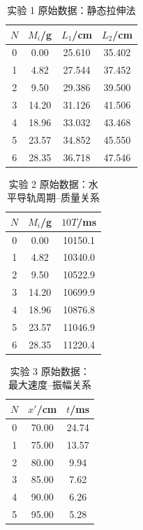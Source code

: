 \documentclass[UTF8,zihao=-4]{ctexart}
\begin{document}
\begin{table}[H]
\centering
\small
\caption{实验 1 原始数据：静态拉伸法}
\label{tab:raw1}
\begin{tabular}{cccc}
\toprule
$N$ & $M_i$/g & $L_1$/cm & $L_2$/cm \\
\midrule
0 & 0.00 & 25.610 & 35.402 \\
1 & 4.82 & 27.544 & 37.452 \\
2 & 9.50 & 29.386 & 39.500 \\
3 & 14.20 & 31.126 & 41.506 \\
4 & 18.96 & 33.032 & 43.468 \\
5 & 23.57 & 34.852 & 45.550 \\
6 & 28.35 & 36.718 & 47.546 \\
\bottomrule
\end{tabular}
\end{table}

\begin{table}[H]
\centering
\small
\caption{实验 2 原始数据：水平导轨周期--质量关系}
\label{tab:raw2}
\begin{tabular}{ccc}
\toprule
$N$ & $M_i$/g & $10T$/ms \\
\midrule
0 & 0.00 & 10150.1 \\
1 & 4.82 & 10340.0 \\
2 & 9.50 & 10522.9 \\
3 & 14.20 & 10699.9 \\
4 & 18.96 & 10876.8 \\
5 & 23.57 & 11046.9 \\
6 & 28.35 & 11220.4 \\
\bottomrule
\end{tabular}
\end{table}

\begin{table}[H]
\centering
\small
\caption{实验 3 原始数据：最大速度--振幅关系}
\label{tab:raw3}
\begin{tabular}{ccc}
\toprule
$N$ & $x'$/cm & $t$/ms \\
\midrule
0 & 70.00 & 24.74 \\
1 & 75.00 & 13.57 \\
2 & 80.00 & 9.94 \\
3 & 85.00 & 7.62 \\
4 & 90.00 & 6.26 \\
5 & 95.00 & 5.28 \\
\bottomrule
\end{tabular}
\end{table}
\end{document}
